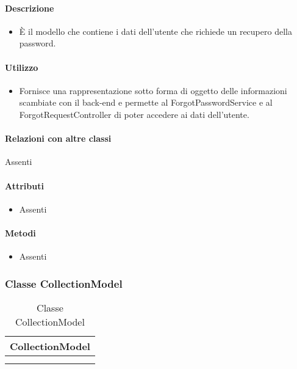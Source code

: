 \paragraph*{Descrizione}
\begin{itemize}
\item[] È il modello che contiene i dati dell'utente che richiede un recupero della password.
\end{itemize}

\paragraph*{Utilizzo}
\begin{itemize}
\item[] Fornisce una rappresentazione sotto forma di oggetto delle informazioni scambiate con il back-end e permette al ForgotPasswordService e al ForgotRequestController di poter accedere ai dati dell'utente.
\end{itemize}

\paragraph*{Relazioni con altre classi}
Assenti

\paragraph*{Attributi}
\begin{itemize}
\item[] Assenti
\end{itemize}

\paragraph*{Metodi}
\begin{itemize}
\item[] Assenti
\end{itemize}

\subsubsection{Classe CollectionModel}

\begin{table}[ht]
\begin{center}
\bgroup
\setlength{\arrayrulewidth}{0.6mm}
\def\arraystretch{1}
\begin{tabular}{ | p{12cm} | }
\hline
\centerline{\textbf{CollectionModel}}
\\ \hline
 \\ 
\hline
 \\ 
\hline
\end{tabular}
\egroup
\caption{Classe CollectionModel}
\end{center}
\end{table}

